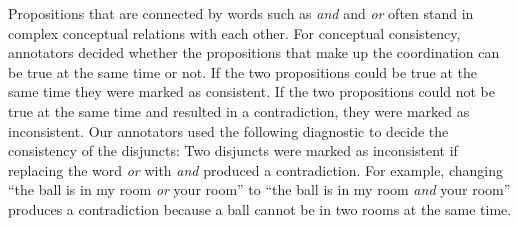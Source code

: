 \documentclass[oneside]{report}
\theoremstyle{definition}
\theoremstyle{definition}
\theoremstyle{definition}
\theoremstyle{remark}
\begin{document}
Propositions that are connected by words such as \emph{and} and
\emph{or} often stand in complex conceptual relations with each other.
For conceptual consistency, annotators decided whether the propositions
that make up the coordination can be true at the same time or not. If
the two propositions could be true at the same time they were marked as
consistent. If the two propositions could not be true at the same time
and resulted in a contradiction, they were marked as inconsistent. Our
annotators used the following diagnostic to decide the consistency of
the disjuncts: Two disjuncts were marked as inconsistent if replacing
the word \emph{or} with \emph{and} produced a contradiction. For
example, changing ``the ball is in my room \emph{or} your room'' to
``the ball is in my room \emph{and} your room'' produces a contradiction
because a ball cannot be in two rooms at the same time.
\end{document}

